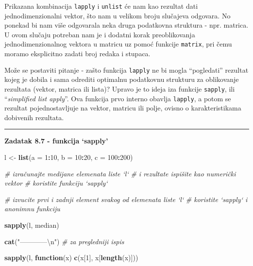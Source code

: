 \documentclass[]{book}
\newenvironment{Shaded}{\begin{snugshade}}{\end{snugshade}}
\newcommand{\KeywordTok}[1]{\textcolor[rgb]{0.13,0.29,0.53}{\textbf{#1}}}
\newcommand{\DataTypeTok}[1]{\textcolor[rgb]{0.13,0.29,0.53}{#1}}
\newcommand{\DecValTok}[1]{\textcolor[rgb]{0.00,0.00,0.81}{#1}}
\newcommand{\CharTok}[1]{\textcolor[rgb]{0.31,0.60,0.02}{#1}}
\newcommand{\StringTok}[1]{\textcolor[rgb]{0.31,0.60,0.02}{#1}}
\newcommand{\CommentTok}[1]{\textcolor[rgb]{0.56,0.35,0.01}{\textit{#1}}}
\newcommand{\ControlFlowTok}[1]{\textcolor[rgb]{0.13,0.29,0.53}{\textbf{#1}}}
\newcommand{\OperatorTok}[1]{\textcolor[rgb]{0.81,0.36,0.00}{\textbf{#1}}}
\newcommand{\NormalTok}[1]{#1}
\theoremstyle{definition}
\theoremstyle{definition}
\theoremstyle{definition}
\theoremstyle{remark}
\begin{document}
Prikazana kombinacija \texttt{lapply} i \texttt{unlist} će nam kao
rezultat dati jednodimenzionalni vektor, što nam u velikom broju
slučajeva odgovara. No ponekad bi nam više odgovarala neka druga
podatkovna struktura - npr. matrica. U ovom slučaju potreban nam je i
dodatni korak preoblikovanja jednodimenzionalnog vektora u matricu uz
pomoć funkcije \texttt{matrix}, pri čemu moramo eksplicitno zadati broj
redaka i stupaca.

Može se postaviti pitanje - zašto funkcija \texttt{lapply} ne bi mogla
``pogledati'' rezultat kojeg je dobila i sama odrediti optimalnu
podatkovnu strukturu za oblikovanje rezultata (vektor, matrica ili
lista)? Upravo je to ideja iza funkcije \texttt{sapply}, ili
``\emph{simplified list apply}''. Ova funkcija prvo interno obavlja
\texttt{lapply}, a potom se rezultat pojednostavljuje na vektor, matricu
ili polje, ovisno o karakteristikama dobivenih rezultata.

\begin{center}\rule{0.5\linewidth}{\linethickness}\end{center}

\textbf{Zadatak 8.7 - funkcija `sapply'}

\begin{Shaded}
\begin{Highlighting}[]
\NormalTok{l <-}\StringTok{ }\KeywordTok{list}\NormalTok{(}\DataTypeTok{a =} \DecValTok{1}\OperatorTok{:}\DecValTok{10}\NormalTok{, }\DataTypeTok{b =} \DecValTok{10}\OperatorTok{:}\DecValTok{20}\NormalTok{, }\DataTypeTok{c =} \DecValTok{100}\OperatorTok{:}\DecValTok{200}\NormalTok{)}


\CommentTok{# izračunajte medijane elemenata liste `l` }
\CommentTok{# i rezultate ispišite kao numerički vektor}
\CommentTok{# koristite funkciju `sapply`}


\CommentTok{# izvucite prvi i zadnji element svakog od elemenata liste `l`}
\CommentTok{# koristite `sapply` i anonimnu funkciju}
\end{Highlighting}
\end{Shaded}

\begin{Shaded}
\begin{Highlighting}[]
\KeywordTok{sapply}\NormalTok{(l, median)}

\KeywordTok{cat}\NormalTok{(}\StringTok{"------------}\CharTok{\textbackslash{}n}\StringTok{"}\NormalTok{)  }\CommentTok{# za pregledniji ispis}

\KeywordTok{sapply}\NormalTok{(l, }\ControlFlowTok{function}\NormalTok{(x) }\KeywordTok{c}\NormalTok{(x[}\DecValTok{1}\NormalTok{], x[}\KeywordTok{length}\NormalTok{(x)]))}
\end{Highlighting}
\end{Shaded}
\end{document}
